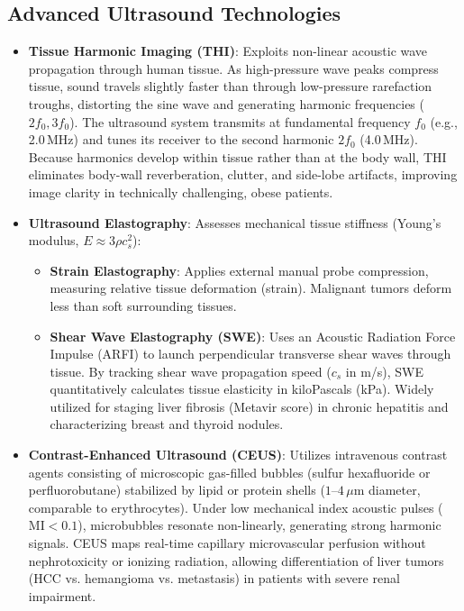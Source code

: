 \documentclass[11pt,a4paper]{article}
\begin{document}
\subsection{Advanced Ultrasound Technologies}
\begin{itemize}[leftmargin=*]
    \item \textbf{Tissue Harmonic Imaging (THI)}: Exploits non-linear acoustic wave propagation through human tissue. As high-pressure wave peaks compress tissue, sound travels slightly faster than through low-pressure rarefaction troughs, distorting the sine wave and generating harmonic frequencies ($2f_0, 3f_0$). The ultrasound system transmits at fundamental frequency $f_0$ (e.g., 2.0\,MHz) and tunes its receiver to the second harmonic $2f_0$ (4.0\,MHz). Because harmonics develop within tissue rather than at the body wall, THI eliminates body-wall reverberation, clutter, and side-lobe artifacts, improving image clarity in technically challenging, obese patients.
    \item \textbf{Ultrasound Elastography}: Assesses mechanical tissue stiffness (Young's modulus, $E \approx 3 \rho c_s^2$):
    \begin{itemize}
        \item \textbf{Strain Elastography}: Applies external manual probe compression, measuring relative tissue deformation (strain). Malignant tumors deform less than soft surrounding tissues.
        \item \textbf{Shear Wave Elastography (SWE)}: Uses an Acoustic Radiation Force Impulse (ARFI) to launch perpendicular transverse shear waves through tissue. By tracking shear wave propagation speed ($c_s$ in m/s), SWE quantitatively calculates tissue elasticity in kiloPascals (kPa). Widely utilized for staging liver fibrosis (Metavir score) in chronic hepatitis and characterizing breast and thyroid nodules.
    \end{itemize}
    \item \textbf{Contrast-Enhanced Ultrasound (CEUS)}: Utilizes intravenous contrast agents consisting of microscopic gas-filled bubbles (sulfur hexafluoride or perfluorobutane) stabilized by lipid or protein shells ($1\text{--}4\,\mu\text{m}$ diameter, comparable to erythrocytes). Under low mechanical index acoustic pulses ($\text{MI} < 0.1$), microbubbles resonate non-linearly, generating strong harmonic signals. CEUS maps real-time capillary microvascular perfusion without nephrotoxicity or ionizing radiation, allowing differentiation of liver tumors (HCC vs. hemangioma vs. metastasis) in patients with severe renal impairment.
\end{itemize}
\end{document}
